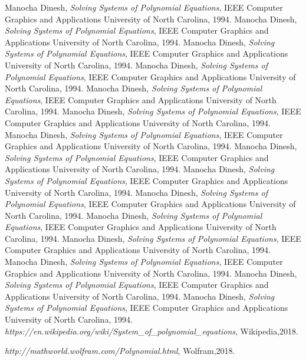 \documentclass[11pt]{article}
\begin{document}
\begin{thebibliography}{1}
  Manocha Dinesh,
  \textit{Solving Systems of Polynomial Equations},
   IEEE Computer Graphics and Applications
   University of North Carolina,
   1994.
  Manocha Dinesh,
  \textit{Solving Systems of Polynomial Equations},
   IEEE Computer Graphics and Applications
   University of North Carolina,
   1994.
  Manocha Dinesh,
  \textit{Solving Systems of Polynomial Equations},
   IEEE Computer Graphics and Applications
   University of North Carolina,
   1994.
  Manocha Dinesh,
  \textit{Solving Systems of Polynomial Equations},
   IEEE Computer Graphics and Applications
   University of North Carolina,
   1994.
  Manocha Dinesh,
  \textit{Solving Systems of Polynomial Equations},
   IEEE Computer Graphics and Applications
   University of North Carolina,
   1994.
  Manocha Dinesh,
  \textit{Solving Systems of Polynomial Equations},
   IEEE Computer Graphics and Applications
   University of North Carolina,
   1994.
  Manocha Dinesh,
  \textit{Solving Systems of Polynomial Equations},
   IEEE Computer Graphics and Applications
   University of North Carolina,
   1994.
  Manocha Dinesh,
  \textit{Solving Systems of Polynomial Equations},
   IEEE Computer Graphics and Applications
   University of North Carolina,
   1994.
  Manocha Dinesh,
  \textit{Solving Systems of Polynomial Equations},
   IEEE Computer Graphics and Applications
   University of North Carolina,
   1994.
  Manocha Dinesh,
  \textit{Solving Systems of Polynomial Equations},
   IEEE Computer Graphics and Applications
   University of North Carolina,
   1994.
  Manocha Dinesh,
  \textit{Solving Systems of Polynomial Equations},
   IEEE Computer Graphics and Applications
   University of North Carolina,
   1994.
  Manocha Dinesh,
  \textit{Solving Systems of Polynomial Equations},
   IEEE Computer Graphics and Applications
   University of North Carolina,
   1994.
  Manocha Dinesh,
  \textit{Solving Systems of Polynomial Equations},
   IEEE Computer Graphics and Applications
   University of North Carolina,
   1994.
  Manocha Dinesh,
  \textit{Solving Systems of Polynomial Equations},
   IEEE Computer Graphics and Applications
   University of North Carolina,
   1994.
  Manocha Dinesh,
  \textit{Solving Systems of Polynomial Equations},
   IEEE Computer Graphics and Applications
   University of North Carolina,
   1994.
  \textit{ https://en.wikipedia.org/wiki/System\_of\_polynomial\_equations},
   Wikipedia,2018.
   
  \textit{ http://mathworld.wolfram.com/Polynomial.html},
   Wolfram,2018.

\end{thebibliography}
\end{document}

